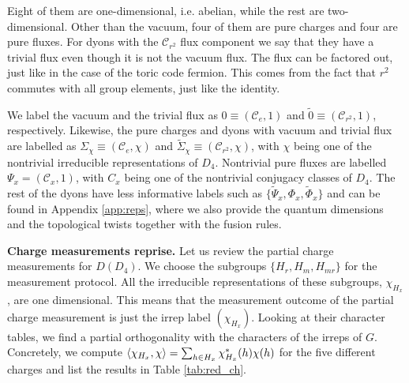 \documentclass[a4paper,twocolumn,11pt, accepted=2024-06-14]{quantumarticle}
\begin{document}
Eight of them are one-dimensional, i.e. abelian, while the rest are two-dimensional. Other than the vacuum, four of them are pure charges and four are pure fluxes. For dyons with the $\mathcal{C}_{r^2}$ flux component we say that they have a trivial flux even though it is not the vacuum flux. The flux can be factored out, just like in the case of the toric code fermion. This comes from the fact that $r^2$ commutes with all group elements, just like the identity. 



 We label the vacuum and the trivial flux as $0 \equiv (\mathcal{C}_e, 1)$ and $\tilde 0 \equiv (\mathcal{C}_{r^2}, 1)$, respectively. Likewise, the pure charges and dyons with vacuum and trivial flux are labelled as $\Sigma_{\chi} \equiv (\mathcal{C}_e, \chi)$ and $\tilde{\Sigma}_{\chi} \equiv (\mathcal{C}_{r^2}, \chi)$, with $\chi$ being one of the nontrivial irreducible representations of $D_4$.
Nontrivial pure fluxes are labelled $\Psi_x = (\mathcal{C}_x, 1)$, with $C_x$ being one of the nontrivial conjugacy classes of $D_4$. The rest of the dyons have less informative labels such as $\{\tilde{\Psi}_x, \Phi_x, \tilde{\Phi}_x\}$ and can be found in Appendix \ref{app:reps}, where we also provide the quantum dimensions and the topological twists together with the fusion rules. 

\textbf{Charge measurements reprise.}
Let us review the partial charge measurements for $D(D_4)$.
We choose the subgroups $\{H_r, H_m, H_{mr}\}$ for the measurement protocol. All the irreducible representations of these subgroups, $\chi_{H_x}$, are one dimensional. This means that the measurement outcome of the partial charge measurement is just the irrep label $(\chi_{H_x})$. Looking at their character tables, we find a partial orthogonality with the characters of the irreps of $G$. Concretely, we compute $ \braket{\chi_{H_x}, \chi} = \sum_{h\in H_x} \chi^*_{H_x}(h)\chi(h)$ for the five different charges and list the results in Table \ref{tab:red_ch}.
\end{document}
